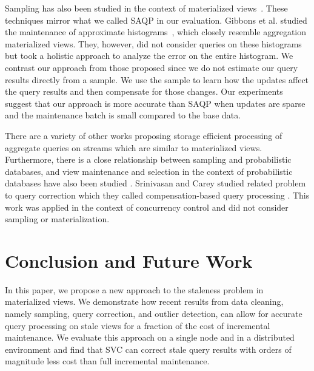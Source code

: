 Sampling has also been studied in the context of materialized views~\cite{joshi2008materialized,DBLP:conf/icde/OlkenR92}.
These techniques mirror what we called SAQP in our evaluation.
Gibbons et al. studied the maintenance of approximate histograms~\cite{gibbons1997fast}, which closely resemble aggregation materialized views.
They, however, did not consider queries on these histograms but took a holistic approach to analyze the error on the entire histogram.
We contrast our approach from those proposed since we do not estimate our query results directly from a sample.
We use the sample to learn how the updates affect the query results and then compensate for those changes.
Our experiments suggest that our approach is more accurate than SAQP when updates are sparse and the maintenance batch is small compared to the base data.

There are a variety of other works proposing storage efficient processing of aggregate queries on streams \cite{dobra2002processing, greenwald2001space} which are similar to materialized views. Furthermore, there is a close relationship between sampling and probabilistic databases, and view maintenance and selection in the context of probabilistic databases have also been studied \cite{re2007materialized}.
Srinivasan and Carey studied related problem to query correction which they called compensation-based query processing \cite{srinivasanC92}.
This work was applied in the context of concurrency control and did not consider sampling or materialization.

\section{Conclusion and Future Work}\label{conclusion}

In this paper, we propose a new approach to the staleness problem in materialized views.
We demonstrate how recent results from data cleaning, namely sampling, query correction, and outlier detection, can
allow for accurate query processing on stale views for a fraction of the cost of incremental maintenance. 
We evaluate this approach on a single node and in a distributed environment and find that SVC can correct stale query results 
with orders of magnitude less cost than full incremental maintenance.


